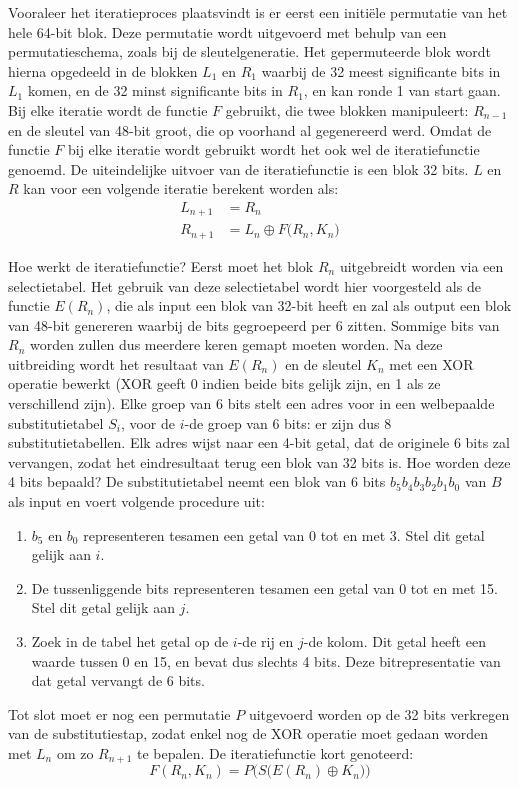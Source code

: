 \documentclass{report}
\begin{document}
	Vooraleer het iteratieproces plaatsvindt is er eerst een initiële permutatie van het hele 64-bit blok. Deze permutatie wordt uitgevoerd met behulp van een permutatieschema, zoals bij de sleutelgeneratie. Het gepermuteerde blok wordt hierna opgedeeld in de blokken $L_1$ en $R_1$ waarbij de 32 meest significante bits in $L_1$ komen, en de 32 minst significante bits in $R_1$, en kan ronde 1 van start gaan. Bij elke iteratie wordt de functie $F$ gebruikt, die twee blokken manipuleert: $R_{n-1}$ en de sleutel van 48-bit groot, die op voorhand al gegenereerd werd. Omdat de functie $F$ bij elke iteratie wordt gebruikt wordt het ook wel de iteratiefunctie genoemd. De uiteindelijke uitvoer van de iteratiefunctie is een blok 32 bits. $L$ en $R$ kan voor een volgende iteratie berekent worden als:
	\begin{equation}
		\begin{split}
			L_{n + 1} & = R_{n} \\
			R_{n + 1} & = L_{n} \mathbin{\oplus} F\big(R_{n}, K_{n}\big)
		\end{split}
		\label{formula:DES}
	\end{equation}

	Hoe werkt de iteratiefunctie? Eerst moet het blok $R_n$ uitgebreidt worden via een selectietabel. Het gebruik van deze selectietabel wordt hier voorgesteld als de functie $E(R_n)$, die als input een blok van 32-bit heeft en zal als output een blok van 48-bit genereren waarbij de bits gegroepeerd per 6 zitten. Sommige bits van $R_n$ worden zullen dus meerdere keren gemapt moeten worden. Na deze uitbreiding wordt het resultaat van $E(R_n)$ en de sleutel $K_n$ met een XOR operatie bewerkt (XOR geeft 0 indien beide bits gelijk zijn, en 1 als ze verschillend zijn). Elke groep van 6 bits stelt een adres voor in een welbepaalde substitutietabel $S_i$, voor de $i$-de groep van 6 bits: er zijn dus 8 substitutietabellen. Elk adres wijst naar een 4-bit getal, dat de originele 6 bits zal vervangen, zodat het eindresultaat terug een blok van 32 bits is. Hoe worden deze 4 bits bepaald? De substitutietabel neemt een blok van 6 bits $b_5b_4b_3b_2b_1b_0$ van $B$ als input en voert volgende procedure uit:
	\begin{enumerate}
		\item $b_5$ en $b_0$ representeren tesamen een getal van 0 tot en met 3. Stel dit getal gelijk aan $i$. 
		\item De tussenliggende bits representeren tesamen een getal van 0 tot en met 15. Stel dit getal gelijk aan $j$.
		\item Zoek in de tabel het getal op de $i$-de rij en $j$-de kolom. Dit getal heeft een waarde tussen 0 en 15, en bevat dus slechts 4 bits. Deze bitrepresentatie van dat getal vervangt de 6 bits.
	\end{enumerate}
	Tot slot moet er nog een permutatie $P$ uitgevoerd worden op de 32 bits verkregen van de substitutiestap, zodat enkel nog de XOR operatie moet gedaan worden met $L_n$ om zo $R_{n + 1}$ te bepalen. De iteratiefunctie kort genoteerd:
	$$F(R_n, K_n) = P\bigg(S\big(E(R_n) \mathbin{\oplus} K_n \big)\bigg)$$
\end{document}
